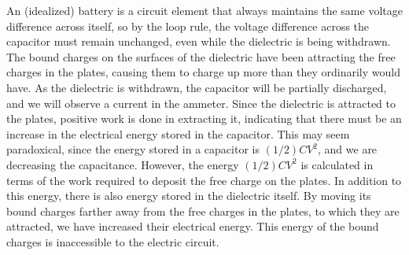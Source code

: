 An (idealized) battery is a circuit
element that always maintains the same voltage difference across
itself, so by the loop rule, the voltage difference across the
capacitor must remain unchanged, even while the dielectric is being
withdrawn. The bound charges on the surfaces of the dielectric have
been attracting the free charges in the plates, causing them to charge
up more than they ordinarily would have. As the dielectric is
withdrawn, the capacitor will be partially discharged, and we will
observe a current in the ammeter. Since the dielectric is attracted to
the plates, positive work is done in extracting it, indicating that
there must be an increase in the electrical energy stored in the
capacitor. This may seem paradoxical, since the energy stored in a
capacitor is $(1/2)CV^2$, and we are decreasing the capacitance.
However, the energy $(1/2)CV^2$ is calculated in terms of the work
required to deposit the free charge on the plates. In addition to this
energy, there is also energy stored in the dielectric itself.  By
moving its bound charges farther away from the free charges in the
plates, to which they are attracted, we have increased their
electrical energy. This energy of the bound charges is inaccessible to
the electric circuit.
